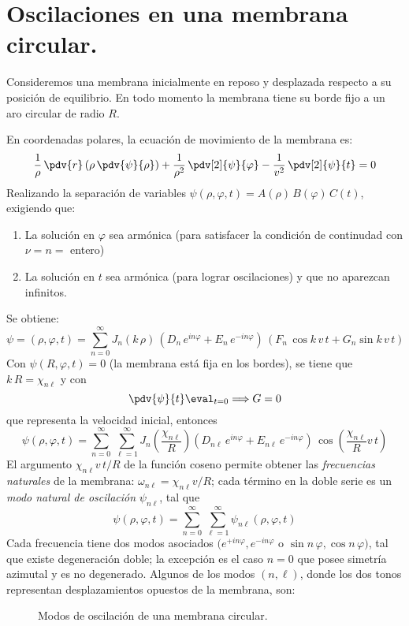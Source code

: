 \section{Oscilaciones en una membrana circular.}
Consideremos una membrana inicialmente en reposo y desplazada respecto a su posición de equilibrio. En todo momento la membrana tiene su borde fijo a un aro circular de radio $R$.
\par
En coordenadas polares, la ecuación de movimiento de la membrana es:
\[ \dfrac{1}{\rho} \, \pdv{r} \left( \rho \, \pdv{\psi}{\rho} \right) + \dfrac{1}{\rho^{2}} \, \pdv[2]{\psi}{\varphi} - \dfrac{1}{v^{2}} \, \pdv[2]{\psi}{t} = 0 \]
Realizando la separación de variables $\psi (\rho, \varphi, t) = A(\rho) \, B(\varphi) \, C(t)$, exigiendo que:
\begin{enumerate}
\item La solución en $\varphi$ sea armónica (para satisfacer la condición de continudad con $\nu = n =$ entero)
\item La solución en $t$ sea armónica (para lograr oscilaciones) y que no aparezcan infinitos.
\end{enumerate}
Se obtiene:
\[ \psi = (\rho, \varphi, t) = \sum_{n=0}^{\infty} J_{n} (k \, \rho) \, \left( D_{n} \, e^{i n \varphi} + E_{n} \, e^{-i n \varphi} \right) \, (F_{n} \, \cos k \, v \, t + G_{n} \sin k \, v \, t) \]
Con $\psi (R, \varphi, t) = 0$ (la membrana está fija en los bordes), se tiene que $k \, R =  \chi_{n \ell}$ y con
\[ \pdv{\psi}{t}\eval_{t=0} \Longrightarrow G = 0\]
que representa la velocidad inicial, entonces
\[ \psi (\rho, \varphi, t) = \sum_{n=0}^{\infty} \, \sum_{\ell=1}^{\infty} J_{n} \left( \dfrac{\chi_{n \ell}}{R} \right) \left( D_{n \ell} \, e^{i n \varphi} + E_{n \ell} \, e^{-i n \varphi} \right) \, \cos \left( \dfrac{\chi_{n \ell}}{R} v \, t \right) \]
El argumento $\chi_{n \ell} v \, t /R $ de la función coseno permite obtener las \emph{frecuencias naturales} de la membrana: $\omega_{n \ell} = \chi_{n \ell} v / R$; cada término en la doble serie es un \emph{modo natural de oscilación} $\psi_{n \ell}$, tal que
\[ \psi (\rho, \varphi, t) = \sum_{n=0}^{\infty} \, \sum_{\ell=1}^{\infty} \psi_{n \ell} (\rho, \varphi, t) \]
Cada frecuencia tiene dos modos asociados $(e^{+i n \varphi}, e^{-i n \varphi}$  o $\sin n \, \varphi, \cos n \, \varphi)$, tal que existe degeneración doble; la excepción es el caso $n = 0$ que posee simetría azimutal y es no degenerado. Algunos de los modos $(n, \ell)$, donde los dos tonos representan desplazamientos opuestos de la membrana, son:
\begin{figure}[H]
    \centering
    
    \caption{Modos de oscilación de una membrana circular.}    
\end{figure}
